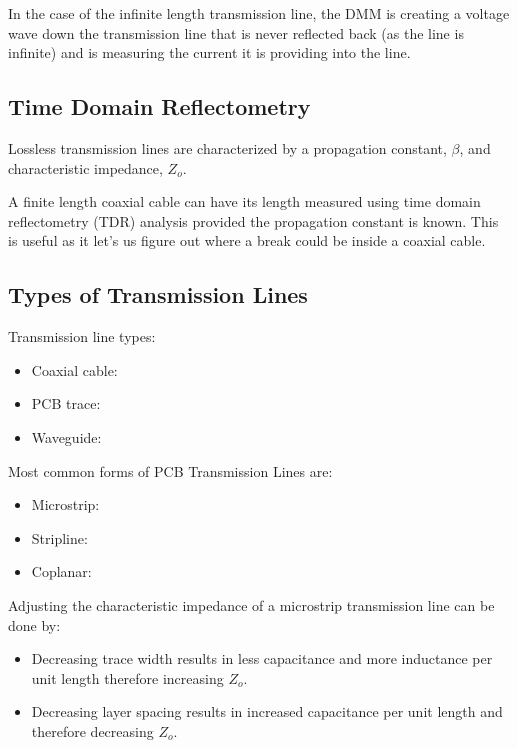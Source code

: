 \documentclass[main.tex]{subfiles}
\begin{document}
In the case of the infinite length transmission line, the DMM is creating a voltage wave down the transmission line that is never reflected back (as the line is infinite) and is measuring the current it is providing into the line.

\subsection{Time Domain Reflectometry}
Lossless transmission lines are characterized by a propagation constant, $\beta$, and characteristic impedance, $Z_o$. 

A finite length coaxial cable can have its length measured using time domain reflectometry (TDR) analysis provided the propagation constant is known. This is useful as it let's us figure out where a break could be inside a coaxial cable. 


\subsection{Types of Transmission Lines}
Transmission line types:
\begin{itemize}
    \item Coaxial cable: 
    \item PCB trace:
    \item Waveguide: 
\end{itemize}

Most common forms of PCB Transmission Lines are:
\begin{itemize}
    \item Microstrip: 
    \item Stripline: 
    \item Coplanar: 
\end{itemize}

Adjusting the characteristic impedance of a microstrip transmission line can be done by:
\begin{itemize}
    \item Decreasing trace width results in less capacitance and more inductance per unit length therefore increasing $Z_o$.
    \item Decreasing layer spacing results in increased capacitance per unit length and therefore decreasing $Z_o$.
\end{itemize}
\end{document}
